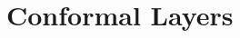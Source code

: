 \documentclass{article}
\begin{document}
\section{Conformal Layers}
%
%
%
%
%
%
%
%
%
%
%
%
%
%
%
%
%
%
\end{document}
